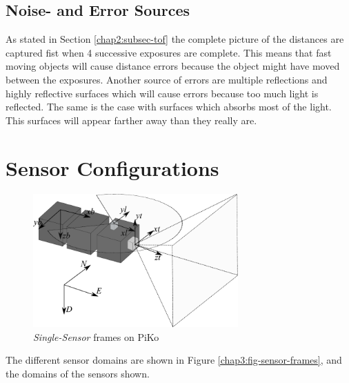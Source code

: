 \subsection{Noise- and Error Sources}
As stated in Section \ref{chap2:subsec-tof} the complete picture of the distances are
captured fist when 4 successive exposures are complete. This means that fast moving
objects will cause distance errors because the object might have moved between the
exposures. Another source of errors are multiple reflections and highly reflective
surfaces which will cause errors because too much light is reflected. The same is the case
with surfaces which absorbs most of the light. This surfaces will appear farther away than
they really are. 




\section{Sensor Configurations}
\label{chap3:sec-sensorconfig}
\begin{figure}[htbp]
    \centering
    \includegraphics[width=0.7\textwidth]{pics/sensor-config}
    \caption{\emph{Single-Sensor} frames on PiKo}
    \label{chap3:fig-single-sensor-frames}
\end{figure}
The different sensor domains are shown in Figure \ref{chap3:fig-sensor-frames}, and the
domains of the sensors shown. 


